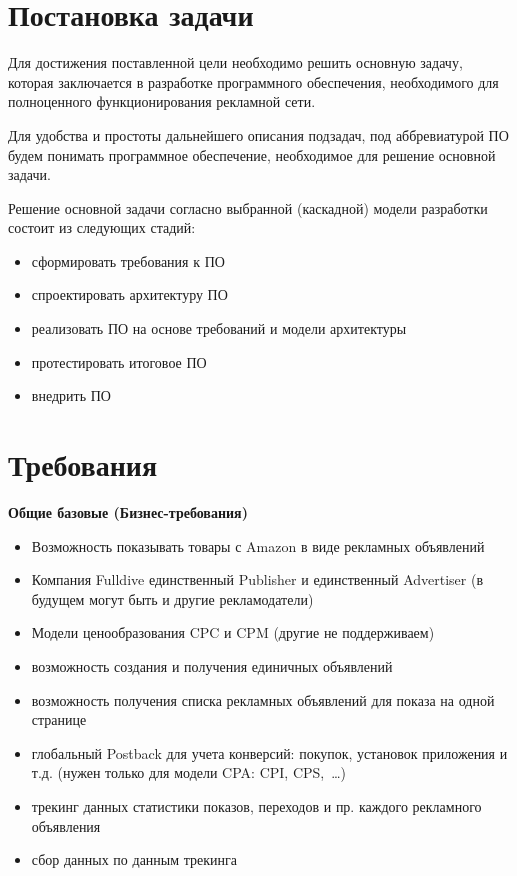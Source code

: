 \documentclass[times]{itmo-student-thesis}
\begin{document}
\section{Постановка задачи}


Для достижения поставленной цели необходимо решить основную задачу, которая заключается в разработке программного обеспечения, необходимого для полноценного функционирования рекламной сети.

Для удобства и простоты дальнейшего описания подзадач, под аббревиатурой ПО будем понимать программное обеспечение, необходимое для решение основной задачи.

Решение основной задачи согласно выбранной (каскадной) модели разработки состоит из следующих стадий:
\begin{itemize}
	\item сформировать требования к ПО
	\item спроектировать архитектуру ПО
	\item реализовать ПО на основе требований и модели архитектуры
	\item протестировать итоговое ПО
	\item внедрить ПО
\end{itemize}
\bigbreak


\section{Требования}\label{sec:requirements}


\textbf{Общие базовые (Бизнес-требования)}
\begin{itemize}
	\item Возможность показывать товары с Amazon в виде рекламных объявлений
	\item Компания Fulldive единственный Publisher и единственный Advertiser (в будущем могут быть и другие рекламодатели)
	\item Модели ценообразования CPC и CPM (другие не поддерживаем)
	\item возможность создания и получения единичных объявлений
	\item возможность получения списка рекламных объявлений для показа на одной странице
	\item глобальный Postback для учета конверсий: покупок, установок приложения и т.д. (нужен только для модели CPA: CPI, CPS, …)
	\item трекинг данных статистики показов, переходов и пр. каждого рекламного объявления
	\item сбор данных по данным трекинга
\end{itemize}
\end{document}
